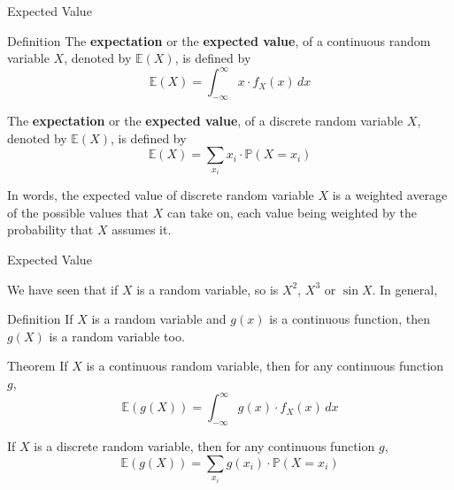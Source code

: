 \documentclass{beamer}
\newcommand{\PP}{\mathbb{P}}
\begin{document}
\begin{frame}{Expected Value}

    \begin{block}{Definition}
      The \textbf{expectation} or the \textbf{expected value}, of a continuous random variable \( X \), denoted by \( \mathbb{E}(X) \), is defined by
\[ \mathbb{E}(X) = \int_{-\infty}^{\infty} x \cdot f_X(x) \, dx \]

      The \textbf{expectation} or the \textbf{expected value}, of a discrete random variable \( X \), denoted by \( \mathbb{E}(X) \), is defined by
\[ \mathbb{E}(X) = \sum_{x_i} x_i\cdot \PP(X=x_i) \]

    \end{block}

\pause
    In words, the expected value of discrete random variable $X$ is a weighted
average of the possible values that $X$ can take on, each value being
weighted by the probability that $X$ assumes it.

\end{frame}


\begin{frame}{Expected Value}

We have seen that if $X$ is a random variable, so is $X^2$, $X^3$ or $\sin{X}$. \pause In general,
\begin{block}{Definition}
If $X$ is a random variable and $g(x)$ is a continuous function, then $g(X)$ is a random variable too.
\end{block}
\pause

    \begin{block}{Theorem}
If \( X \) is a continuous random variable, then for any continuous function \( g \),
\[\mathbb{E}(g(X)) = \int_{-\infty}^{\infty} g(x) \cdot f_X(x) \, dx \]

If \( X \) is a discrete random variable, then for any continuous function \( g \),
\[\mathbb{E}(g(X)) = \sum_{x_i} g(x_i)\cdot \PP(X=x_i)  \]

    \end{block}


\end{frame}
\end{document}
